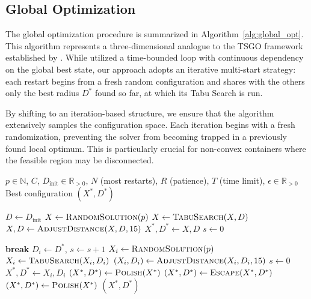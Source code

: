 \documentclass[preprint,12pt]{elsarticle}
\theoremstyle{remark}
\def \R {\mathbb{R}}
\begin{document}
\subsection{Global Optimization}

The global optimization procedure is summarized in
Algorithm~\ref{alg:global_opt}. This algorithm represents a three-dimensional
analogue to the TSGO framework established by \citet{lai2024}. While
\citet{lai2024} utilized a time-bounded loop with continuous dependency on the
global best state, our approach adopts an iterative multi-start strategy: each
restart begins from a fresh random configuration and shares with the others only
the best radius $D^*$ found so far, at which its Tabu Search is run.

By shifting to an iteration-based structure, we ensure that the algorithm
extensively samples the configuration space. Each iteration begins with a fresh
randomization, preventing the solver from becoming trapped in a previously found
local optimum. This is particularly crucial for non-convex containers where the
feasible region may be disconnected.

\begin{algorithm}[H]
  \caption{Global Optimization}
  \begin{algorithmic}[1]
    \Require $p \in \mathbb{N}$, $C$, $D_{\text{init}} \in \R_{>0}$, $N$ (most
    restarts), $R$ (patience), $T$ (time limit), $\epsilon \in \R_{> 0}$
    \Ensure Best configuration $(X^*, D^*)$

    \State $D \gets D_{\text{init}}$
    \State $X \gets \textsc{RandomSolution}(p)$
    \State $X \gets \textsc{TabuSearch}(X, D)$
    \State $X, D \gets \textsc{AdjustDistance}(X, D, 15)$
    \State $X^*, D^* \gets X, D$
    \State $s \gets 0$

    \State \textbf{break}
    \EndIf
    \State $D_i \gets D^*$, \quad $s \gets s + 1$
    \State $X_i \gets \textsc{RandomSolution}(p)$
    \State $X_i \gets \textsc{TabuSearch}(X_i, D_i)$
    \State $(X_i, D_i) \gets \textsc{AdjustDistance}(X_i, D_i, 15)$
    \State $s \gets 0$
    \EndIf
    \State $X^*, D^* \gets X_i, D_i$
    \EndIf
    \EndIf
    \EndFor
    \State $(X^*, D^*) \gets \textsc{Polish}(X^*)$
    \State $(X^*, D^*) \gets \textsc{Escape}(X^*, D^*)$ \label{line:escape}
    \State $(X^*, D^*) \gets \textsc{Polish}(X^*)$
    \EndIf
    \State \Return $(X^*, D^*)$
  \end{algorithmic}
  \label{alg:global_opt}
\end{algorithm}
\end{document}
